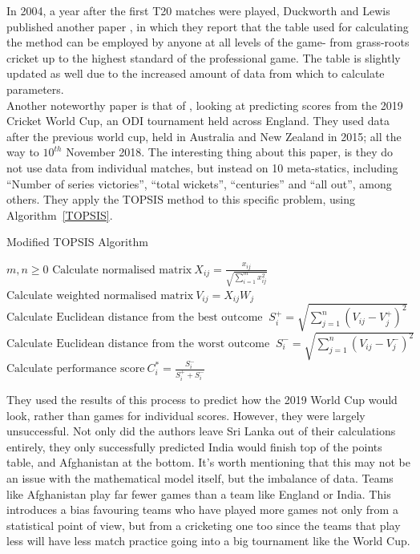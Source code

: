In 2004, a year after the first T20 matches were played, Duckworth and Lewis published another paper \cite{duckworth2}, in which they report
that the table used for calculating the method can be employed by anyone at all levels of the game- from grass-roots cricket up to the highest standard of 
the professional game. The table is slightly updated as well due to the increased amount of data from which to calculate parameters. \\

Another noteworthy paper is that of \cite{saqlain}, looking at predicting scores from the 2019 Cricket World Cup, an ODI
tournament held across England. They used data after the previous world cup, held in Australia and New Zealand in 2015; all the way to $10^{th}$ November
2018. The interesting thing about this paper, is they do not use data from individual matches, but instead on 10 meta-statics, including 
``Number of series victories'', ``total wickets'', ``centuries'' and ``all out'', among others. They apply the TOPSIS method to this specific problem, using Algorithm~\ref{TOPSIS}. \\

\begin{algorithm}[h]
\caption{Modified TOPSIS Algorithm}\label{TOPSIS}
\begin{algorithmic}[1]
    \Require $m,n \geq 0$
    \State $\text{Calculate normalised matrix} \ X_{ij} = \frac{x_{ij}}{\sqrt{\sum_{i=1}^mx_{ij}^2}}$
    \State $\text{Calculate weighted normalised matrix} \ V_{ij}=X_{ij}W_j$
        \State $\text{Calculate Euclidean distance from the best outcome } \ S_i^+ = \sqrt{\sum_{j=1}^n(V_{ij}-V_j^+)^2} \ $
        \State $\text{Calculate Euclidean distance from the worst outcome } \ S_i^- = \sqrt{\sum_{j=1}^n(V_{ij}-V_j^-)^2} \ $
    \EndFor
    \State $\text{Calculate performance score} \ C_i^* = \frac{S_i^-}{S_i^+  + S_i^-}$
\end{algorithmic}
\end{algorithm}

They used the results of this process to predict how the 2019 World Cup would look, rather than games for individual scores. However, they were largely unsuccessful. 
Not only did the authors leave Sri Lanka out of their calculations entirely, they only successfully predicted India would finish top of the points table, and Afghanistan 
at the bottom. It's worth mentioning that this may not be an issue with the mathematical model itself, but the imbalance of data. Teams like Afghanistan play far fewer games 
than a team like England or India. This introduces a bias favouring teams who have played more games not only from a statistical point of view, but from a cricketing one too 
since the teams that play less will have less match practice going into a big tournament like the World Cup. \\

